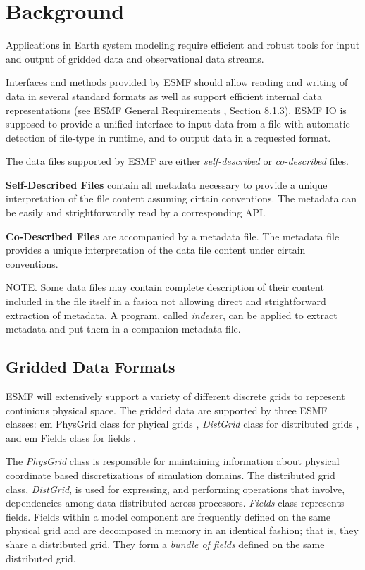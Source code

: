 
\section{Background}

Applications in Earth system modeling require efficient and robust
tools for input and output of gridded data and observational data streams.

Interfaces and methods provided by ESMF should allow reading and
writing of data in several standard formats as well as support
efficient internal data representations (see ESMF General
Requirements \cite{ESMFGenReq}, Section 8.1.3). ESMF IO is supposed to
provide a unified interface to input data from a file with automatic 
detection of file-type in runtime, and to output data in a requested format.

The data files  supported by ESMF are either {\em self-described} or
{\em co-described} files.


{\bf Self-Described Files} contain all metadata
necessary to provide a unique interpretation of the file content
assuming cirtain conventions. The metadata can be easily and
strightforwardly read by a corresponding API.

{\bf Co-Described Files} are accompanied by a metadata file. The
metadata file provides a unique interpretation of the data file content
under cirtain conventions. 


NOTE. Some data files may contain complete description of their
content included in the file itself in a fasion not allowing direct
and strightforward extraction of metadata. A program, called {\em
indexer}, can be applied to extract metadata and put them in a
companion metadata file.


\subsection{Gridded Data Formats}

ESMF will extensively support a variety of different discrete grids to
represent continious physical space. The gridded data are supported by
three ESMF classes: {em PhysGrid} class for phyical grids
\cite{ESMF-PhysGrid-Req}, {\em DistGrid} class for distributed grids
\cite{ESMF-DistGrid-Req}, and {em Fields} class for fields
\cite{ESMF-Field-Req}. 

The {\em PhysGrid} class is responsible for maintaining information
about physical coordinate based discretizations of simulation domains. The
distributed grid class, {\em DistGrid}, is used for expressing, and
performing operations that involve, dependencies among data
distributed across processors. {\em Fields} class represents fields. 
Fields within a model component are frequently defined on the same
physical grid and are decomposed in memory in an identical fashion;
that is, they share a distributed grid. They form a {\em bundle of
fields} defined on the same distributed grid. 

